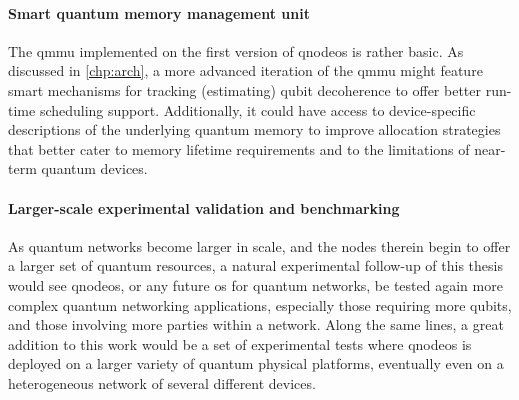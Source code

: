 \paragraph{Smart quantum memory management unit}

The \acrfull{qmmu} implemented on the first version of \acrshort{qnodeos} is rather basic. As
discussed in \cref{chp:arch}, a more advanced iteration of the \acrshort{qmmu} might feature smart
mechanisms for tracking (estimating) qubit decoherence to offer better run-time scheduling support.
Additionally, it could have access to device-specific descriptions of the underlying quantum memory
to improve allocation strategies that better cater to memory lifetime requirements and to the
limitations of near-term quantum devices.

\paragraph{Larger-scale experimental validation and benchmarking}

As quantum networks become larger in scale, and the nodes therein begin to offer a larger set of
quantum resources, a natural experimental follow-up of this thesis would see \acrshort{qnodeos}, or
any future \acrshort{os} for quantum networks, be tested again more complex quantum networking
applications, especially those requiring more qubits, and those involving more parties within a
network. Along the same lines, a great addition to this work would be a set of experimental tests
where \acrshort{qnodeos} is deployed on a larger variety of quantum physical platforms, eventually
even on a heterogeneous network of several different devices.

\begin{xstretch}
\printbibliography[heading=subbibintoc,title={References},notcategory=noprint]
\end{xstretch}
